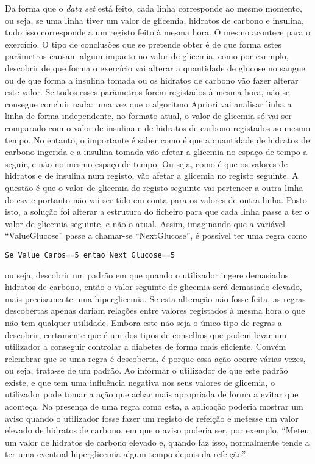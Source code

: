 Da forma que o \textit{data set} está feito, cada linha corresponde ao mesmo momento, ou seja, se uma linha tiver um valor de glicemia, hidratos de carbono e insulina, tudo isso corresponde a um registo feito à mesma hora. O mesmo acontece para o exercício. O tipo de conclusões que se pretende obter é de que forma estes parâmetros causam algum impacto no valor de glicemia, como por exemplo, descobrir de que forma o exercício vai alterar a quantidade de glucose no sangue ou de que forma a insulina tomada ou os hidratos de carbono vão fazer alterar este valor. Se todos esses parâmetros forem registados à mesma hora, não se consegue concluir nada: uma vez que o algoritmo Apriori vai analisar linha a linha de forma independente, no formato atual, o valor de glicemia só vai ser comparado com o valor de insulina e de hidratos de carbono registados ao mesmo tempo. No entanto, o importante é saber como é que a quantidade de hidratos de carbono ingerida e a insulina tomada vão afetar a glicemia no espaço de tempo a seguir, e não no mesmo espaço de tempo. Ou seja, como é que os valores de hidratos e de insulina num registo, vão afetar a glicemia no registo seguinte. A questão é que o valor de glicemia do registo seguinte vai pertencer a outra linha do csv e portanto não vai ser tido em conta para os valores de outra linha. Posto isto, a solução foi alterar a estrutura do ficheiro para que cada linha passe a ter o valor de glicemia seguinte, e não o atual. Assim, imaginando que a variável ``Value\textunderscore Glucose'' passe a chamar-se ``Next\textunderscore Glucose'', é possível ter uma regra como

\begin{lstlisting}
Se Value_Carbs==5 entao Next_Glucose==5
\end{lstlisting} 

ou seja, descobrir um padrão em que quando o utilizador ingere demasiados hidratos de carbono, então o valor seguinte de glicemia será demasiado elevado, mais precisamente uma hiperglicemia. Se esta alteração não fosse feita, as regras descobertas apenas dariam relações entre valores registados à mesma hora o que não tem qualquer utilidade. Embora este não seja o único tipo de regras a descobrir, certamente que é um dos tipos de conselhos que podem levar um utilizador a conseguir controlar a diabetes de forma mais eficiente. Convém relembrar que se uma regra é descoberta, é porque essa ação ocorre várias vezes, ou seja, trata-se de um padrão. Ao informar o utilizador de que este padrão existe, e que tem uma influência negativa nos seus valores de glicemia, o utilizador pode tomar a ação que achar mais apropriada de forma a evitar que aconteça. Na presença de uma regra como esta, a aplicação poderia mostrar um aviso quando o utilizador fosse fazer um registo de refeição e metesse um valor elevado de hidratos de carbono, em que o aviso poderia ser, por exemplo, ``Meteu um valor de hidratos de carbono elevado e, quando faz isso, normalmente tende a ter uma eventual hiperglicemia algum tempo depois da refeição''.

